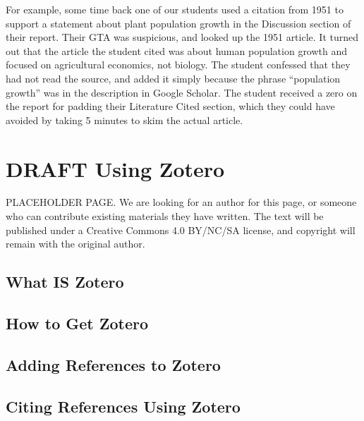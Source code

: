 \documentclass[
]{book}
\begin{document}
For example, some time back one of our students used a citation from 1951 to support a statement about plant population growth in the Discussion section of their report. Their GTA was suspicious, and looked up the 1951 article. It turned out that the article the student cited was about human population growth and focused on agricultural economics, not biology. The student confessed that they had not read the source, and added it simply because the phrase ``population growth'' was in the description in Google Scholar. The student received a zero on the report for padding their Literature Cited section, which they could have avoided by taking 5 minutes to skim the actual article.

\hypertarget{zotero520}{%
\chapter{DRAFT Using Zotero}\label{zotero520}}

PLACEHOLDER PAGE. We are looking for an author for this page, or someone who can contribute existing materials they have written. The text will be published under a Creative Commons 4.0 BY/NC/SA license, and copyright will remain with the original author.

\hypertarget{what-is-zotero}{%
\section*{What IS Zotero}\label{what-is-zotero}}

\hypertarget{how-to-get-zotero}{%
\section*{How to Get Zotero}\label{how-to-get-zotero}}

\hypertarget{adding-references-to-zotero}{%
\section*{Adding References to Zotero}\label{adding-references-to-zotero}}

\hypertarget{citing-references-using-zotero}{%
\section*{Citing References Using Zotero}\label{citing-references-using-zotero}}
\end{document}
